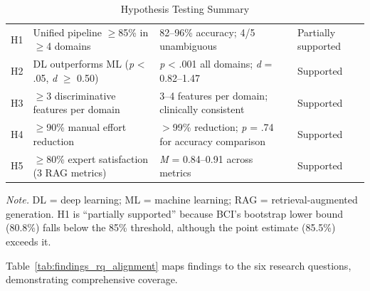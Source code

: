 \begin{table}[H]
\tablestripes
\begin{tabularx}{\textwidth}{p{0.6cm} L L L}
\toprule
{} &  &  &  \\
\midrule
H1 & Unified pipeline $\geq$85\% in $\geq$4 domains & 82--96\% accuracy; 4/5 unambiguous & Partially supported \\
\addlinespace
H2 & DL outperforms ML (\textit{p} < .05, \textit{d} $\geq$ 0.50) & \textit{p} < .001 all domains; \textit{d} = 0.82--1.47 & Supported \\
\addlinespace
H3 & $\geq$3 discriminative features per domain & 3--4 features per domain; clinically consistent & Supported \\
\addlinespace
H4 & $\geq$90\% manual effort reduction & $>$99\% reduction; \textit{p} = .74 for accuracy comparison & Supported \\
\addlinespace
H5 & $\geq$80\% expert satisfaction (3 RAG metrics) & \textit{M} = 0.84--0.91 across metrics & Supported \\
\bottomrule
\end{tabularx}
\caption{Hypothesis Testing Summary}
\label{tab:hypothesis_summary}
\vspace{0.5em}\noindent\textit{Note.} DL = deep learning; ML = machine learning; RAG = retrieval-augmented generation. H1 is ``partially supported'' because BCI's bootstrap lower bound (80.8\%) falls below the 85\% threshold, although the point estimate (85.5\%) exceeds it.
\end{table}

Table~\ref{tab:findings_rq_alignment} maps findings to the six research questions, demonstrating comprehensive coverage.

